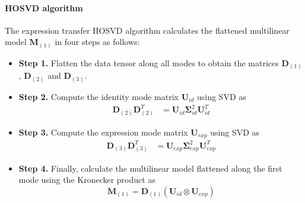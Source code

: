 \documentclass[11pt,a4paper,twoside]{report}
\begin{document}
\paragraph{HOSVD algorithm} The expression transfer HOSVD algorithm calculates
the flattened multilinear model $\mathbf{M}_{(1)}$ in four steps as follows:
\begin{itemize}
\item \textbf{Step 1.} Flatten the data tensor along all modes to obtain the
  matrices $\mathbf{D}_{(1)}$, $\mathbf{D}_{(2)}$ and $\mathbf{D}_{(3)}$.
\item \textbf{Step 2.} Compute the identity mode matrix $\mathbf{U}_{id}$ using
  SVD as
\begin{align}\label{eq:hosvdsvdi}
\mathbf{D}_{(2)}\mathbf{D}_{(2)}^T &= \mathbf{U}_{id} \mathbf{\Sigma}_{id}^2 \mathbf{U}_{id}^T
\end{align}
\item \textbf{Step 3.} Compute the expression mode matrix $\mathbf{U}_{exp}$ using
  SVD as
\begin{align}\label{eq:hosvdsvde}
\mathbf{D}_{(3)}\mathbf{D}_{(3)}^T &= \mathbf{U}_{exp} \mathbf{\Sigma}_{exp}^2 \mathbf{U}_{exp}^T
\end{align}
\item \textbf{Step 4.} Finally, calculate the multilinear model flattened along
  the first mode using the Kronecker product as
\begin{equation}
\mathbf{M}_{(1)} = \mathbf{D}_{(1)} (\mathbf{U}_{id} \otimes \mathbf{U}_{exp})
\end{equation}
\end{itemize}
\end{document}
